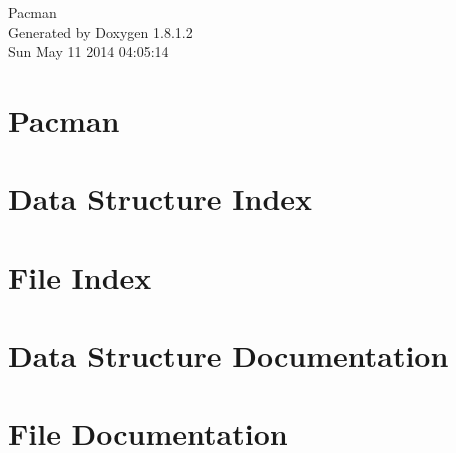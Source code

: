 \documentclass{book}
\begin{document}
\hypersetup{pageanchor=false,citecolor=blue}
\begin{titlepage}
\vspace*{7cm}
\begin{center}
{\Large Pacman }\\
\vspace*{1cm}
{\large Generated by Doxygen 1.8.1.2}\\
\vspace*{0.5cm}
{\small Sun May 11 2014 04:05:14}\\
\end{center}
\end{titlepage}
\clearemptydoublepage
{}
\tableofcontents
\clearemptydoublepage
{}
\hypersetup{pageanchor=true,citecolor=blue}
\chapter{Pacman}
\label{md_README}
\hypertarget{md_README}{}

\chapter{Data Structure Index}

\chapter{File Index}

\chapter{Data Structure Documentation}










\chapter{File Documentation}



































\printindex
\end{document}
